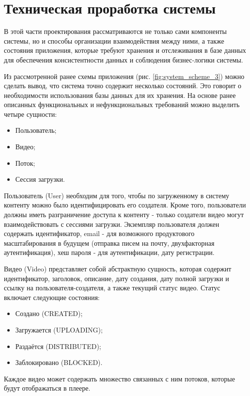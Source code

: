 \section{Техническая проработка системы} \label{ch2:technical_study}

	В этой части проектирования рассматриваются не только сами компоненты системы, но и способы организации взаимодействия между ними, а также состояния приложения, которые требуют хранения и отслеживания в базе данных для обеспечения консистентности данных и соблюдения бизнес-логики системы.

	Из рассмотренной ранее схемы приложения (рис. \ref{fig:system_scheme_3}) можно сделать вывод, что система точно содержит несколько состояний. Это говорит о необходимости использования базы данных для их хранения. На основе ранее описанных функциональных и нефункциональных требований можно выделить четыре сущности:
	\begin{itemize}[label=$\bullet$]
		\item Пользователь;
		\item Видео;
		\item Поток;
		\item Сессия загрузки.
	\end{itemize}

	Пользователь (User) необходим для того, чтобы по загруженному в систему контенту можно было идентифицировать его создателя. Кроме того, пользователи должны иметь разграничение доступа к контенту - только создатели видео могут взаимодействовать с сессиями загрузки. Экземпляр пользователя должен содержать идентификатор, email - для возможного продуктового масштабирования в будущем (отправка писем на почту, двухфакторная аутентификация), хеш пароля - для аутентификации, дату регистрации.

	Видео (Video) представляет собой абстрактную сущность, которая содержит идентификатор, заголовок, описание, дату создания, дату полной загрузки и ссылку на пользователя-создателя, а также текущий статус видео. Статус включает следующие состояния:
	\begin{itemize}[label=$\bullet$]
		\item Создано (CREATED);
		\item Загружается (UPLOADING);
		\item Раздаётся (DISTRIBUTED);
		\item Заблокировано (BLOCKED).
	\end{itemize}

	Каждое видео может содержать множество связанных с ним потоков, которые будут отображаться в плеере.

